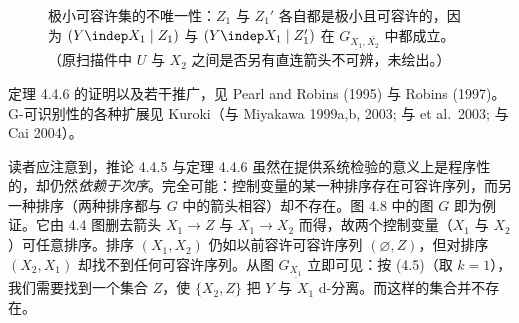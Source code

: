 \begin{figure}[htbp]
\centering
{}
\caption{极小可容许集的不唯一性：$Z_1$ 与 $Z_1'$ 各自都是极小且可容许的，因为 $(Y\indep X_1\mid Z_1)$ 与 $(Y\indep X_1\mid Z_1')$ 在 $G_{\underline{X_1},\bar{X_2}}$ 中都成立。（原扫描件中 $U$ 与 $X_2$ 之间是否另有直连箭头不可辨，未绘出。）}
\label{fig:4.7}
\end{figure}

定理 4.4.6 的证明以及若干推广，见 Pearl and Robins (1995) 与 Robins (1997)。G-可识别性的各种扩展见 Kuroki（与 Miyakawa 1999a,b, 2003; 与 et al.~2003; 与 Cai 2004）。

读者应注意到，推论 4.4.5 与定理 4.4.6 虽然在提供系统检验的意义上是程序性的，却仍然\emph{依赖于次序}。完全可能：控制变量的某一种排序存在可容许序列，而另一种排序（两种排序都与 $G$ 中的箭头相容）却不存在。图 4.8 中的图 $G$ 即为例证。它由 4.4 图删去箭头 $X_1\to Z$ 与 $X_1\to X_2$ 而得，故两个控制变量（$X_1$ 与 $X_2$）可任意排序。排序 $(X_1,X_2)$ 仍如以前容许可容许序列 $(\varnothing,Z)$，但对排序 $(X_2,X_1)$ 却找不到任何可容许序列。从图 $G_{\underline{X_1}}$ 立即可见：按 \textup{(4.5)}（取 $k=1$），我们需要找到一个集合 $Z$，使 $\{X_2,Z\}$ 把 $Y$ 与 $X_1$ d-分离。而这样的集合并不存在。

